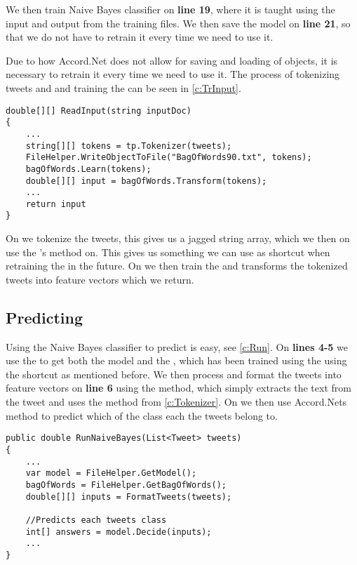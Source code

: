 We then train Naive Bayes classifier on \textbf{line 19}, where it is taught
using the input and output from the training files. We then save the model on
\textbf{line 21}, so that we do not have to retrain it every time we need to use
it.\nl

Due to how Accord.Net does not allow for saving and loading of
 objects, it is necessary to retrain it every time we need to
use it. The process of tokenizing tweets and and training the 
can be seen in \autoref{c:TrInput}.\nl

\begin{minipage}[H]{\linewidth}
\begin{lstlisting}[caption = Create and train the bag of words, label =
c:TrInput] 
double[][] ReadInput(string inputDoc)
{
    ...
    string[][] tokens = tp.Tokenizer(tweets);
    FileHelper.WriteObjectToFile("BagOfWords90.txt", tokens);
    bagOfWords.Learn(tokens);
    double[][] input = bagOfWords.Transform(tokens);
    ...
	return input
}
\end{lstlisting}
\end{minipage}

On  we tokenize the tweets, this gives us a jagged string array,
which we then on  use the
's  method on.
This gives us something we can use as shortcut when retraining the
 in the future. On  we then train the
 and transforms the tokenized tweets into feature vectors
which we return.


\subsection{Predicting}

Using the Naive Bayes classifier to predict is easy, see \autoref{c:Run}. On
\textbf{lines 4-5} we use the  to get both the model and
the , which has been trained using the using the shortcut as
mentioned before. We then process and format the tweets into feature vectors on
\textbf{line 6} using the  method, which simply extracts the
text from the tweet and uses the  method from
\autoref{c:Tokenizer}. On  we then use Accord.Nets 
method to predict which of the class each the tweets belong to.

\begin{minipage}[H]{\linewidth}
\begin{lstlisting}[caption = Load the Naive Bayes model and find
bias, label = c:Run] 
public double RunNaiveBayes(List<Tweet> tweets)
{
    ...
    var model = FileHelper.GetModel();
    bagOfWords = FileHelper.GetBagOfWords();
    double[][] inputs = FormatTweets(tweets);

    //Predicts each tweets class
    int[] answers = model.Decide(inputs);
    ...
}
\end{lstlisting}
\end{minipage}

